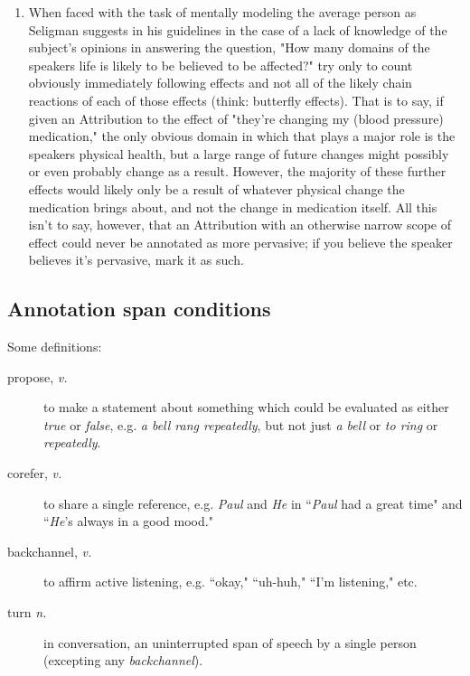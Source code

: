 \documentclass[a4paper,12pt]{article}
\begin{document}
\begin{enumerate}
\begin{enumerate}
                \item When faced with the task of mentally modeling the average person as Seligman suggests in his guidelines in the case of a lack of knowledge of the subject's opinions in answering the question, "How many domains of the speakers life is likely to be believed to be affected?" try only to count obviously immediately following effects and not all of the likely chain reactions of each of those effects (think: butterfly effects). That is to say, if given an Attribution to the effect of "they're changing my (blood pressure) medication," the only obvious domain in which that plays a major role is the speakers physical health, but a large range of future changes might possibly or even probably change as a result. However, the majority of these further effects would likely only be a result of whatever physical change the medication brings about, and not the change in medication itself. All this isn't to say, however, that an Attribution with an otherwise narrow scope of effect could never be annotated as more pervasive; if you believe the speaker believes it's pervasive, mark it as such.
            \end{enumerate}
        \end{enumerate}

    \newpage
    \subsection{Annotation span conditions} \label{conditions}
        Some definitions:
        \begin{description}
            \item[propose, \emph{v.}] to make a statement about something which could be evaluated as either \emph{true} or \emph{false},
                e.g. \emph{a bell rang repeatedly}, but not just \emph{a bell} or \emph{to ring} or \emph{repeatedly}.
            \item[corefer, \emph{v.}] to share a single reference,
                e.g. \emph{Paul} and \emph{He} in ``\emph{Paul} had a great time" and ``\emph{He}'s always in a good mood."
            \item[backchannel, \emph{v.}] to affirm active listening, e.g. ``okay," ``uh-huh," ``I'm listening," etc.
            \item[turn \emph{n.}] in conversation, an uninterrupted span of speech by a single person (excepting any \emph{backchannel}).
        \end{description}
\end{document}
